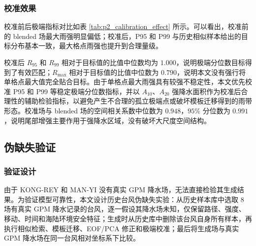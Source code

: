 \documentclass[UTF8,a4paper,zihao=5,fontset=fandol]{ctexart}
\numberwithin{equation}{section}
\numberwithin{figure}{section}
\numberwithin{table}{section}
\begin{document}
\subsubsection{校准效果}

校准前后极端指标对比如表 \ref{tab:p2_calibration_effect} 所示。可以看出，校准前的 blended 场最大雨强明显偏低；校准后，P95 和 P99 与历史相似样本给出的目标分布基本一致，最大格点雨强也提升到合理量级。

\begin{table}[H]
\centering
\caption{极端分位数校准前后指标对比}
\label{tab:p2_calibration_effect}
\end{table}

校准后 $R_{95}$ 和 $R_{99}$ 相对于目标值的比值中位数均为 $1.000$，说明极端分位数目标得到了有效匹配；$R_{\max}$ 相对于目标值的比值中位数为 $0.790$，说明本文没有强行将单格点最大值完全贴合目标。由于单格点最大雨强具有较强不稳定性，本文优先校准 P95 和 P99 等稳定极端分位数指标，并以 $A_{10}$、$A_{20}$ 强降水面积作为校准后合理性的辅助检验指标，以避免产生不合理的孤立极端点或破坏模板迁移得到的雨带形态。校准场与 blended 场的空间相关系数中位数为 $0.948$，$95\%$ 分位数为 $0.991$，说明尾部增强主要作用于强降水区域，没有破坏大尺度空间结构。

\subsection{伪缺失验证}

\subsubsection{验证设计}

由于 KONG-REY 和 MAN-YI 没有真实 GPM 降水场，无法直接检验其生成结果。为验证模型可靠性，本文设计历史台风伪缺失实验：从历史样本库中选取 $8$ 场有真实 GPM 降水记录的台风，逐一假设其降水场未知，仅保留路径、强度、移动、时间和海陆环境安全特征；生成时从历史库中删除该台风自身所有样本，再执行相似检索、模板迁移、EOF/PCA 修正和极端校准；最后将生成场与真实 GPM 降水场在同一台风相对坐标系下比较。
\end{document}
